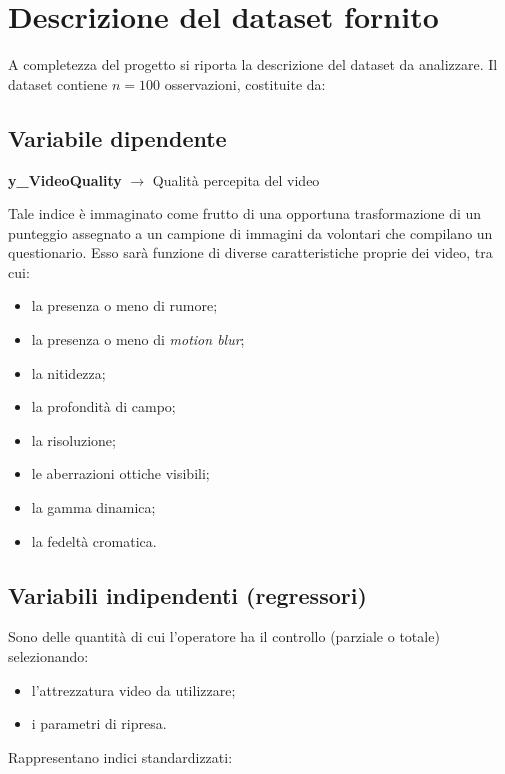 \section{Descrizione del dataset fornito}
A completezza del progetto si riporta la descrizione del dataset da analizzare. Il dataset contiene $n=100$ osservazioni, costituite da:

\subsection*{Variabile dipendente}
\textbf{y\_VideoQuality} \quad $\rightarrow$ \quad Qualità percepita del video

Tale indice è immaginato come frutto di una opportuna trasformazione di un punteggio assegnato a un campione di immagini da volontari che compilano un questionario. Esso sarà funzione di diverse caratteristiche proprie dei video, tra cui:

\begin{itemize}
	\item la presenza o meno di rumore;
	\item la presenza o meno di \textit{motion blur};
	\item la nitidezza;
	\item la profondità di campo;
	\item la risoluzione;
	\item le aberrazioni ottiche visibili;
	\item la gamma dinamica;
	\item la fedeltà cromatica.
\end{itemize}

\subsection*{Variabili indipendenti (regressori)}

Sono delle quantità di cui l’operatore ha il controllo (parziale o totale) selezionando:

\begin{itemize}
	\item l’attrezzatura video da utilizzare;
	\item i parametri di ripresa.
\end{itemize}

Rappresentano indici standardizzati:

